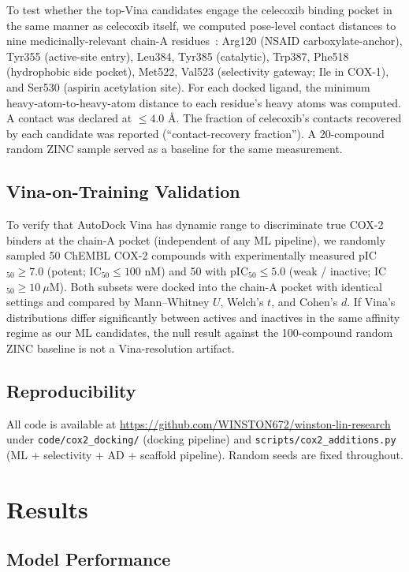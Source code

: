 \documentclass[11pt]{article}
\begin{document}
To test whether the top-Vina candidates engage the celecoxib binding pocket in the same manner as celecoxib itself, we computed pose-level contact distances to nine medicinally-relevant chain-A residues~\cite{kurumbail1996}: Arg120 (NSAID carboxylate-anchor), Tyr355 (active-site entry), Leu384, Tyr385 (catalytic), Trp387, Phe518 (hydrophobic side pocket), Met522, Val523 (selectivity gateway; Ile in COX-1), and Ser530 (aspirin acetylation site). For each docked ligand, the minimum heavy-atom-to-heavy-atom distance to each residue's heavy atoms was computed. A contact was declared at $\leq 4.0$ \r{A}. The fraction of celecoxib's contacts recovered by each candidate was reported (``contact-recovery fraction''). A 20-compound random ZINC sample served as a baseline for the same measurement.

\subsection{Vina-on-Training Validation}

To verify that AutoDock Vina has dynamic range to discriminate true COX-2 binders at the chain-A pocket (independent of any ML pipeline), we randomly sampled 50 ChEMBL COX-2 compounds with experimentally measured pIC$_{50} \geq 7.0$ (potent; IC$_{50} \leq 100$ nM) and 50 with pIC$_{50} \leq 5.0$ (weak / inactive; IC$_{50} \geq 10\ \mu$M). Both subsets were docked into the chain-A pocket with identical settings and compared by Mann--Whitney $U$, Welch's $t$, and Cohen's $d$. If Vina's distributions differ significantly between actives and inactives in the same affinity regime as our ML candidates, the null result against the 100-compound random ZINC baseline is not a Vina-resolution artifact.

\subsection{Reproducibility}

All code is available at \url{https://github.com/WINSTON672/winston-lin-research} under \texttt{code/cox2\_docking/} (docking pipeline) and \texttt{scripts/cox2\_additions.py} (ML + selectivity + AD + scaffold pipeline). Random seeds are fixed throughout.

\section{Results}

\subsection{Model Performance}
\end{document}
